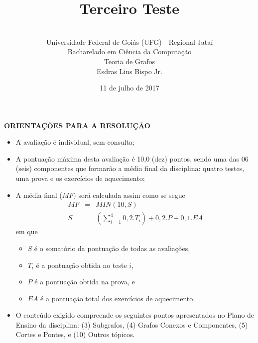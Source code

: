 \documentclass[12pt,a4paper,oneside]{article}
\author{\\Universidade Federal de Goiás (UFG) - Regional Jataí\\Bacharelado em Ciência da Computação \\Teoria de Grafos \\Esdras Lins Bispo Jr.}
\title{\sc \huge Terceiro Teste}
\date{11 de julho de 2017}
\begin{document}
\maketitle

{\bf ORIENTAÇÕES PARA A RESOLUÇÃO}

\footnotesize

\begin{itemize}
	\item A avaliação é individual, sem consulta;
	\item A pontuação máxima desta avaliação é 10,0 (dez) pontos, sendo uma das 06 (seis) componentes que formarão a média final da disciplina: quatro testes, uma prova e os exercícios de aquecimento;
	\item A média final ($MF$) será calculada assim como se segue
	\begin{eqnarray}
		MF & = & MIN(10, S) \nonumber \\
		S & = & (\sum_{i=1}^{4} 0,2.T_i ) + 0,2.P  + 0,1.EA \nonumber
	\end{eqnarray}
	em que 
	\begin{itemize}
		\item $S$ é o somatório da pontuação de todas as avaliações,
		\item $T_i$ é a pontuação obtida no teste $i$,
		\item $P$ é a pontuação obtida na prova, e
		\item $EA$ é a pontuação total dos exercícios de aquecimento.
	\end{itemize}
	\item O conteúdo exigido compreende os seguintes pontos apresentados no Plano de Ensino da disciplina: (3) Subgrafos, (4) Grafos Conexos e Componentes, (5) Cortes e Pontes, e (10) Outros tópicos.
\end{itemize}


\begin{center}
\end{center}

\newpage

\normalsize
\end{document}
